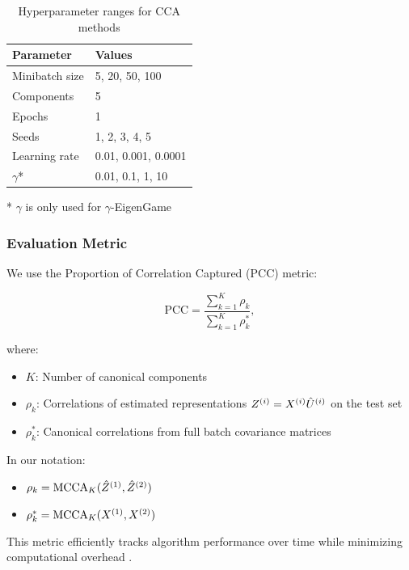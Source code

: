 \begin{table}[h!]
    \centering
    \caption{Hyperparameter ranges for CCA methods}
    \label{tab:hyperparameters}
    \begin{tabular}{|l|l|}
        \hline
        Parameter             & Values              \\
        \hline
        Minibatch size        & 5, 20, 50, 100      \\
        Components            & 5                   \\
        Epochs                & 1                   \\
        Seeds                 & 1, 2, 3, 4, 5       \\
        Learning rate         & 0.01, 0.001, 0.0001 \\
        $\gamma$*             & 0.01, 0.1, 1, 10    \\
        \hline
    \end{tabular}
    \footnotesize{* $\gamma$ is only used for $\gamma$-EigenGame}
\end{table}

\subsubsection{Evaluation Metric}
We use the Proportion of Correlation Captured (PCC) metric:

\begin{equation}
\text{PCC} = \frac{\sum_{k=1}^K \rho_k}{\sum_{k=1}^K \rho_k^*},
\end{equation}

where:
\begin{itemize}
    \item $K$: Number of canonical components
    \item $\rho_k$: Correlations of estimated representations $Z^{(i)}=X^{(i)}\hat{U}^{(i)}$ on the test set
    \item $\rho_k^*$: Canonical correlations from full batch covariance matrices
\end{itemize}

In our notation:
\begin{itemize}
    \item $\rho_k = \operatorname{MCCA}_K(\hat{Z}^{(1)}, \hat{Z}^{(2)})$
    \item $\rho_k^* = \operatorname{MCCA}_K(X^{(1)}, X^{(2)})$
\end{itemize}

This metric efficiently tracks algorithm performance over time while minimizing computational overhead \citep{meng2021online, gemp2022generalized, ma2015finding, ge2016efficient}.

